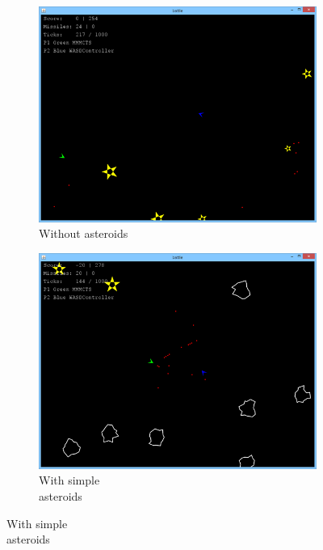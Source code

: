 \begin{figure}
	\caption{Screenshots from the three game modes.}
	\begin{subfigure}[b]{0.15\textwidth}
		\center
		\includegraphics[scale=0.17]{resources/gamemode2}
		\caption{Without asteroids\\\hspace{\textwidth}}
	\end{subfigure}
	\begin{subfigure}[b]{0.15\textwidth}
		\center
		\includegraphics[scale=0.17]{resources/gamemode1}
		\caption{With simple\\asteroids}
	\end{subfigure}

\end{figure}
